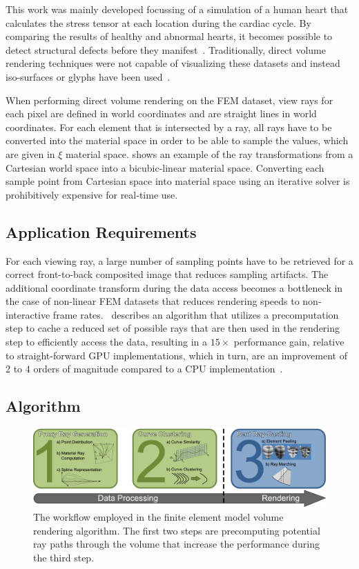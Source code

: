 This work was mainly developed focussing of a simulation of a human heart that calculates the stress tensor at each location during the cardiac cycle.  By comparing the results of healthy and abnormal hearts, it becomes possible to detect structural defects before they manifest~\cite{young1992three, young1995tracking}. Traditionally, direct volume rendering techniques were not capable of visualizing these datasets and instead iso-surfaces or glyphs have been used~\cite{wunsche2003visualization}.

When performing direct volume rendering on the FEM dataset, view rays for each pixel are defined in world coordinates and are straight lines in world coordinates.  For each element that is intersected by a ray, all rays have to be converted into the material space in order to be able to sample the values, which are given in $\xi$ material space.   shows an example of the ray transformations from a Cartesian world space into a bicubic-linear material space.  Converting each sample point from Cartesian space into material space using an iterative solver is prohibitively expensive for real-time use.


\subsection{Application Requirements} \label{contributions:fem:requirements}
For each viewing ray, a large number of sampling points have to be retrieved for a correct front-to-back composited image that reduces sampling artifacts.  The additional coordinate transform during the data access becomes a bottleneck in the case of non-linear FEM datasets that reduces rendering speeds to non-interactive frame rates.  \paperFEM\ describes an algorithm that utilizes a precomputation step to cache a reduced set of possible rays that are then used in the rendering step to efficiently access the data, resulting in a $15\times$ performance gain, relative to straight-forward GPU implementations, which in turn, are an improvement of 2 to 4 orders of magnitude compared to a CPU implementation~\cite{liu12gpu}.


\subsection{Algorithm} \label{contributions:fem:algorithm}
\begin{figure}
\centering
\includegraphics[width=\textwidth]{figures/contributions/fem/workflow.pdf}
\caption{The workflow employed in the finite element model volume rendering algorithm.  The first two steps are precomputing potential ray paths through the volume that increase the performance during the third step.}
\label{contributions:fem:workflow}
\end{figure}

